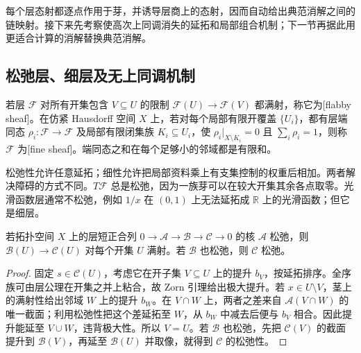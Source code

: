每个层态射都逐点作用于芽，并诱导层商上的态射，因而自动给出典范消解之间的链映射。接下来先考察使高次上同调消失的延拓和局部组合机制；下一节再据此用更适合计算的消解替换典范消解。

\subsection{松弛层、细层及无上同调机制}
\label{g2:subsec:0701:04}
\begin{definition}\label{g2:def:flabby-fine}
	若层 \(\mathcal F\) 对所有开集包含 \(V\subseteq U\) 的限制 \(\mathcal F(U)\to\mathcal F(V)\) 都满射，称它为[flabby sheaf]。在仿紧 Hausdorff 空间 \(X\) 上，若对每个局部有限开覆盖 \(\{U_i\}\)，都有层端同态 \(\rho_i:\mathcal F\to\mathcal F\) 及局部有限闭集族 \(K_i\subseteq U_i\)，使 \(\rho_i|_{X\setminus K_i}=0\) 且 \(\sum_i\rho_i=1\)，则称 \(\mathcal F\) 为[fine sheaf]。端同态之和在每个足够小的邻域都是有限和。
\end{definition}

松弛性允许任意延拓；细性允许把局部资料乘上有支集控制的权重后相加。两者解决障碍的方式不同。\(T\mathcal F\) 总是松弛，因为一族芽可以在较大开集其余各点取零。光滑函数层通常不松弛，例如 \(1/x\) 在 \((0,1)\) 上无法延拓成 \(\mathbb R\) 上的光滑函数；但它是细层。

\begin{lemma}\label{g2:lem:flabby-lifting}
	若拓扑空间 \(X\) 上的层短正合列 \(0\to\mathcal A\to\mathcal B\to\mathcal C\to0\) 的核 \(\mathcal A\) 松弛，则 \(\mathcal B(U)\to\mathcal C(U)\) 对每个开集 \(U\) 满射。若 \(\mathcal B\) 也松弛，则 \(\mathcal C\) 松弛。
\end{lemma}
\begin{proof}
	固定 \(s\in\mathcal C(U)\)，考虑它在开子集 \(V\subseteq U\) 上的提升 \(b_V\)，按延拓排序。全序族可由层公理在开集之并上粘合，故 Zorn 引理给出极大提升。若 \(x\in U\setminus V\)，茎上的满射性给出邻域 \(W\) 上的提升 \(b_W\)。在 \(V\cap W\) 上，两者之差来自 \(\mathcal A(V\cap W)\) 的唯一截面；利用松弛性把这个差延拓至 \(W\)，从 \(b_W\) 中减去后便与 \(b_V\) 相合。因此提升能延至 \(V\cup W\)，违背极大性。所以 \(V=U\)。若 \(\mathcal B\) 也松弛，先把 \(\mathcal C(V)\) 的截面提升到 \(\mathcal B(V)\)，再延至 \(\mathcal B(U)\) 并取像，就得到 \(\mathcal C\) 的松弛性。
\end{proof}


